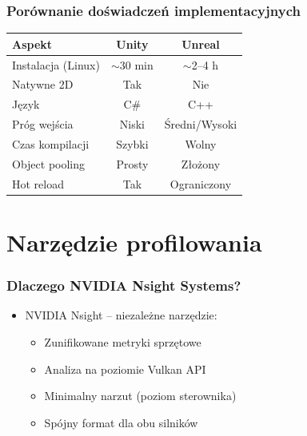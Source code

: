 \documentclass{beamer}
\begin{document}
\begin{frame}
  \frametitle{Porównanie doświadczeń implementacyjnych}
  \begin{table}
    \centering
    \small
    \begin{tabular}{lcc}
      \toprule
      \textbf{Aspekt} & \textbf{Unity} & \textbf{Unreal} \\
      \midrule
      Instalacja (Linux) & $\sim$30 min & $\sim$2--4 h \\
      Natywne 2D & Tak & Nie \\
      Język & C\# & C++ \\
      Próg wejścia & Niski & Średni/Wysoki \\
      Czas kompilacji & Szybki & Wolny \\
      Object pooling & Prosty & Złożony \\
      Hot reload & Tak & Ograniczony \\
      \bottomrule
    \end{tabular}
  \end{table}
\end{frame}

\section{Narzędzie profilowania}

\begin{frame}
  \frametitle{Dlaczego NVIDIA Nsight Systems?}
  \begin{itemize}
    \item NVIDIA Nsight -- niezależne narzędzie:
    \begin{itemize}
      \item Zunifikowane metryki sprzętowe
      \item Analiza na poziomie Vulkan API
      \item Minimalny narzut (poziom sterownika)
      \item Spójny format dla obu silników
    \end{itemize}
  \end{itemize}
\end{frame}
\end{document}
